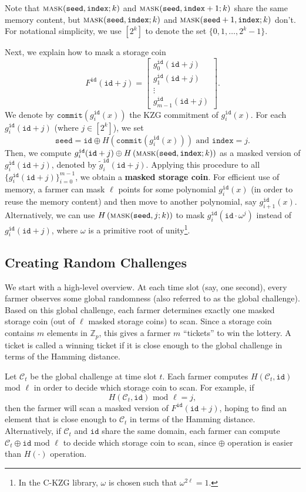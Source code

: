\documentclass[12pt,draftcls,onecolumn]{IEEEtran}
\newcommand{\Fp}{\mathbb{Z}_p}
\newcommand{\id}{\texttt{id}}
\newcommand{\seed}{\texttt{seed}}
\newcommand{\ind}{\texttt{index}}
\newcommand{\cmt}{\texttt{commit}}
\newcommand{\mask}{\textsc{mask}}
\begin{document}
Note that $\mask(\seed, \ind; k)$ and $\mask(\seed, \ind + 1; k)$ share the same memory content, but $\mask(\seed, \ind; k)$
and $\mask(\seed + 1, \ind; k)$ don't. For notational simplicity, we use $[2^k]$ to denote the set $\{0, 1, \ldots, 2^k - 1 \}$.

Next, we explain how to mask a storage coin
\[
F^{\id}(\id + j) = \begin{bmatrix} g_0^{\id}(\id + j)\\ g_1^{\id}(\id + j)\\  \vdots \\ g_{m-1}^{\id}(\id + j) \end{bmatrix}.
\]
We denote by $\cmt\left(g_i^{\id}(x)\right)$ the KZG commitment of $g_i^{\id}(x)$.
For each $g_i^{\id}(\id + j)$ (where $j \in [2^k]$), we set
\[
\seed = \id \oplus H\left( \cmt\left(g_i^{\id}(x)\right) \right) \mbox{ and } \ind = j.
\]
Then, we compute $g_i^{\id}(\id + j) \oplus H\left( \mask(\seed, \ind; k) \right)$ as a masked version of $g_i^{\id}(\id + j)$, denoted by $\tilde{g}_i^{\id}(\id + j)$.
Applying this procedure to all $\{ g_i^{\id}(\id + j) \}_{i = 0}^{m - 1}$, we obtain a {\bf masked storage coin}.
For efficient use of memory, a farmer can mask $\ell$ points for some polynomial $g_i^{\id}(x)$ (in order to reuse the memory content) and then move to another polynomial, say $g_{i+1}^{\id}(x)$.
Alternatively,
we can use $H\left( \mask(\seed, j; k) \right)$ to mask $g_i^{\id}(\id \cdot \omega^j)$ instead of $g_i^{\id}(\id + j)$, where $\omega$ is a primitive root of unity\footnote{In the C-KZG library, $\omega$ is chosen such that $\omega^{2 \ell} = 1$.}.

\subsection{Creating Random Challenges}

We start with a high-level overview. At each time slot (say, one second), every farmer observes some global randomness (also referred to as the global challenge). 
Based on this global challenge, each farmer determines exactly one masked storage coin (out of $\ell$ masked storage coins) to scan. Since a storage coin contains $m$ elements in $\Fp$, this gives a farmer $m$ ``tickets'' to win the lottery. A ticket is called a winning ticket if it is close enough to the global challenge in terms of the Hamming distance.

Let $\mathcal{C}_t$ be the global challenge at time slot $t$. Each farmer computes $H(\mathcal{C}_t, \id)$ mod $\ell$ in order to decide which storage coin to scan.
For example, if 
\[
H(\mathcal{C}_t, \id) \mbox{ mod } \ell = j,
\]
then the farmer will scan a masked version of $F^{\id}(\id + j)$, hoping to find an element that is close enough to $\mathcal{C}_t$ in terms of the Hamming distance. 
Alternatively, if $\mathcal{C}_t$ and $\id$ share the same domain, each farmer can compute $\mathcal{C}_t \oplus \id$ mod $\ell$ to decide which storage coin to scan, since $\oplus$ operation is easier than $H(\cdot)$ operation. 
\end{document}
